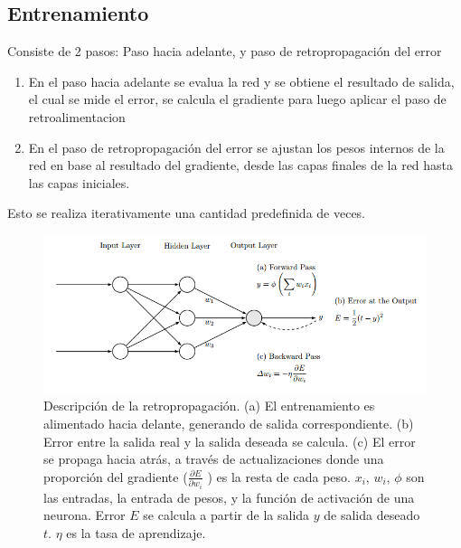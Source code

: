 \documentclass[a4paper,11pt,spanish]{book}
\begin{document}
    \subsection {Entrenamiento}
      Consiste de 2 pasos: Paso hacia adelante, y paso de retropropagación del error
      \begin{enumerate}
	\item En el paso hacia adelante se evalua la red y se obtiene el resultado de salida, el cual se mide el error, se calcula el gradiente para luego aplicar el paso de retroalimentacion
	\item En el paso de retropropagación del error se ajustan los pesos internos de la red en base al resultado del gradiente, desde las capas finales de la red hasta las capas iniciales.
      \end{enumerate}
      Esto se realiza iterativamente una cantidad predefinida de veces.
      \begin{figure}[H]
	\begin{center}
	 \includegraphics[width=\linewidth]{./img/backprop.png}
	\end{center}
	\caption{ Descripción de la retropropagación. (a) El entrenamiento es alimentado hacia delante, generando de salida correspondiente. (b) Error entre la salida real y la salida deseada
	se calcula. (c) El error se propaga hacia atrás, a través de actualizaciones donde una proporción del gradiente ($ \frac{\partial E}{\partial w_i}$ ) es la resta de cada peso. $x_i$, $w_i$, $\phi$ son las entradas,
	la entrada de pesos, y la función de activación de una neurona. Error $E$ se calcula a partir de la salida $y$ de salida deseado $t$. $\eta$ es la tasa de aprendizaje. 
	\cite{Automatic_differentiation_ML} }
	\label{fig:backprop}
      \end{figure}
\end{document}
